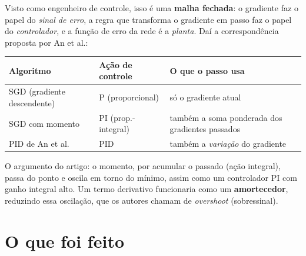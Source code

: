\documentclass[11pt,a4paper]{article}
\begin{document}
Visto como engenheiro de controle, isso é uma \textbf{malha fechada}: o gradiente
faz o papel do \emph{sinal de erro}, a regra que transforma o gradiente em passo
faz o papel do \emph{controlador}, e a função de erro da rede é a \emph{planta}. Daí
a correspondência proposta por An et al.:

\begin{center}
\begin{tabular}{llp{6.2cm}}
\toprule
Algoritmo & Ação de controle & O que o passo usa \\
\midrule
SGD (gradiente descendente) & P (proporcional) & só o gradiente atual \\
SGD com momento & PI (prop.-integral) & também a soma ponderada dos gradientes passados \\
PID de An et al. & PID & também a \emph{variação} do gradiente \\
\bottomrule
\end{tabular}
\end{center}

O argumento do artigo: o momento, por acumular o passado (ação integral), passa do
ponto e oscila em torno do mínimo, assim como um controlador PI com ganho
integral alto. Um termo derivativo funcionaria como um \textbf{amortecedor},
reduzindo essa oscilação, que os autores chamam de \emph{overshoot} (sobressinal).

\section{O que foi feito}
\end{document}
